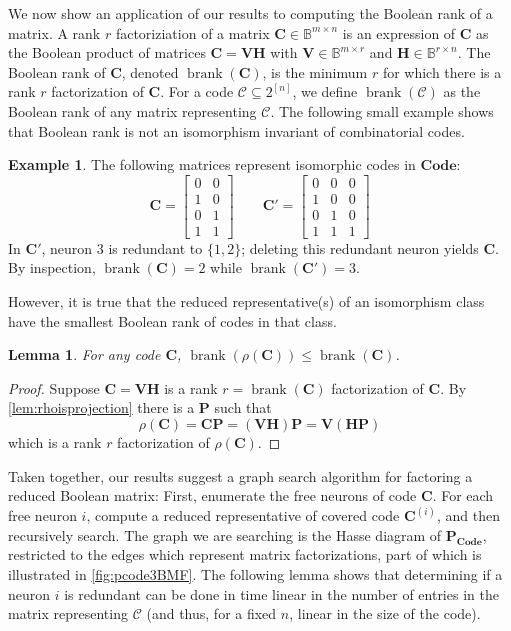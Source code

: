 \documentclass[11pt,letterpaper, reqno]{amsart}
\newtheorem{lem}[thm]{Lemma}         %
\theoremstyle{definition}
\newtheorem{ex}[thm]{Example}        %
\DeclareMathOperator{\brank}{brank}
\def\B{\mathbb{B}}
\def\bC{\mathbf{C}}
\def\bH{\mathbf{H}}
\def\bP{\mathbf{P}}
\def\bV{\mathbf{V}}
\def\cC{\mathcal{C}}
\def\pcode{\mathbf{P_{Code}}}
\def\code{\mathbf{Code}}
\begin{document}
    We now show an application of our results to computing the Boolean rank of a matrix.
    A rank $r$ factoriziation of a matrix $\bC \in \B^{m\times n}$ is an expression of $\bC$ as the Boolean product of matrices $\bC = \bV\bH$ with $\bV\in \B^{m\times r}$ and $\bH \in \B^{r\times n}$. The Boolean rank of $\bC$, denoted $\brank(\bC)$, is the minimum $r$ for which there is a rank $r$ factorization of $\bC$.
    For a code $\cC \subseteq 2^{[n]}$, we define $\brank(\cC)$ as the Boolean rank of any matrix representing $\cC$.
    The following small example shows that Boolean rank is not an isomorphism invariant of combinatorial codes.
    \begin{ex}\label{ex:isomorphicnotbrank}
        The following matrices represent isomorphic codes in $\code$:
        \[ \bC = \begin{bmatrix}
            0&0\\
            1&0\\
            0&1\\
            1&1
        \end{bmatrix} \qquad
        \bC' = \begin{bmatrix}
            0&0&0\\
            1&0&0\\
            0&1&0\\
            1&1&1
        \end{bmatrix}\]
        In $\bC'$, neuron $3$ is redundant to $\{1,2\}$; deleting this redundant neuron yields $\bC$. By inspection, $\brank(\bC) = 2$ while $\brank(\bC') = 3$.
    \end{ex}
    
    However, it is true that the reduced representative(s) of an isomorphism class have the smallest Boolean rank of codes in that class.
    \begin{lem}\label{lem:reducedminimumrank}
        For any code $\bC$, $\brank(\rho(\bC)) \leq \brank(\bC)$.
    \end{lem}
    \begin{proof}
        Suppose $\bC = \bV\bH$ is a rank $r = \brank(\bC)$ factorization of $\bC$. By \cref{lem:rhoisprojection} there is a $\bP$ such that
        \[ \rho(\bC) = \bC\bP = (\bV\bH)\bP = \bV(\bH\bP)\]
        which is a rank $r$ factorization of $\rho(\bC)$.
    \end{proof}


    Taken together, our results suggest a graph search algorithm for factoring a reduced Boolean matrix: First, enumerate the free neurons of code $\bC$. For each free neuron $i$, compute a reduced representative of covered code $\bC^{(i)}$, and then recursively search. The graph we are searching is the Hasse diagram of $\pcode$, restricted to the edges which represent matrix factorizations, part of which is illustrated in \cref{fig:pcode3BMF}.
    The following lemma shows that determining if a neuron $i$ is redundant can be done in time linear in the number of entries in the matrix representing $\cC$ (and thus, for a fixed $n$, linear in the size of the code).
\end{document}
